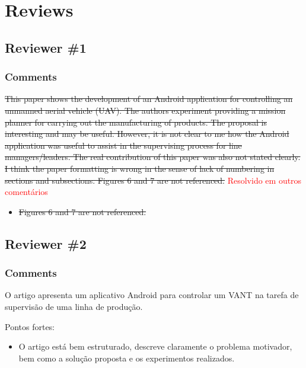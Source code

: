 \documentclass[12pt]{article}
\begin{document}
\setcounter{secnumdepth}{0}

\section{Reviews}

\subsection{Reviewer \#1}

\subsubsection{Comments}

\sout{This paper shows the development of an Android application for controlling an unmanned aerial vehicle (UAV). The authors experiment providing a mission planner for carrying out  the manufacturing of products. The proposal is interesting and may be useful. However, it is not clear to me how the Android application was useful to assist in the supervising process for line managers/leaders. The real contribution of this paper was also not stated clearly. I think the paper formatting is wrong in the sense of lack of numbering in sections and subsections. Figures 6 and 7 are not referenced.} \textcolor{red}{Resolvido em outros comentários}

\begin{itemize}
\item \sout{Figures 6 and 7 are not referenced.}
\end{itemize}

\subsection{Reviewer \#2}

\subsubsection{Comments}

O artigo apresenta um aplicativo Android para controlar um VANT na tarefa de supervisão de uma linha de produção.

Pontos fortes:

\begin{itemize}
\item O artigo está bem estruturado, descreve claramente o problema motivador, bem como a solução proposta e os experimentos realizados.
\end{itemize}
\end{document}
